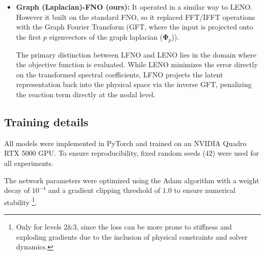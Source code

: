 \begin{itemize}
\begin{itemize}
    \item \textbf{Graph (Laplacian)-FNO (ours):} It operated in a similar way to LENO.
    However it built on the standard FNO, so it replaced FFT/IFFT operations with the Graph Fourier Transform (GFT, where the input is projected onto the first $p$ eigenvectors of the graph laplacian ($\mathbf{\Phi}_p$)).
    
   The primary distinction between LFNO and LENO lies in the domain where the objective function is evaluated. While LENO minimizes the error directly on the transformed spectral coefficients, LFNO projects the latent representation back into the physical space via the inverse GFT, penalizing the reaction term directly at the nodal level.
    
        
        
    \end{itemize}
\end{itemize}


\subsection{Training details}
All models were implemented in PyTorch and trained on an NVIDIA Quadro RTX 5000 GPU. To ensure reproducibility, fixed random seeds ($42$) were used for all experiments.

The network parameters were optimized using the Adam algorithm with a weight decay of $10^{-4}$ and a gradient clipping threshold of $1.0$ to ensure numerical stability
\footnote{Only for levels $2\&3$, since the loss can be more prone to stiffness and exploding gradients due to the inclusion of physical constraints and solver dynamics.}.

